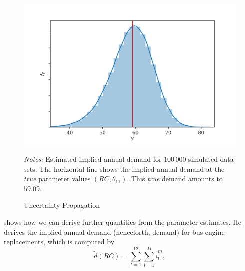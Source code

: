 \begin{figure}[t]
	\caption{Uncertainty Propagation}
    \label{uncertainty}
	\begin{centering}
	\vspace*{-4mm}
	\begin{centering}
		\includegraphics[scale=0.9]{../figures/uncertainty_propagation_100000.png}
	\end{centering}
	\end{centering}

	\small
	\textit{Notes:} Estimated implied annual demand for $100\,000$ simulated data sets. The horizontal line shows the implied annual demand at the \textit{true} parameter values $(RC, \theta_{11})$. This \textit{true} demand amounts to $59.09$.
\end{figure}

\citet{R87} shows how we can derive further quantities from the parameter estimates. He derives the implied annual demand (henceforth, demand) for bus-engine replacements, which is computed by
\begin{equation*}
\tilde{d}(RC)=\sum_{t=1}^{12} \sum_{i=1}^{M} {\tilde{i}}_t^m,
\end{equation*}

